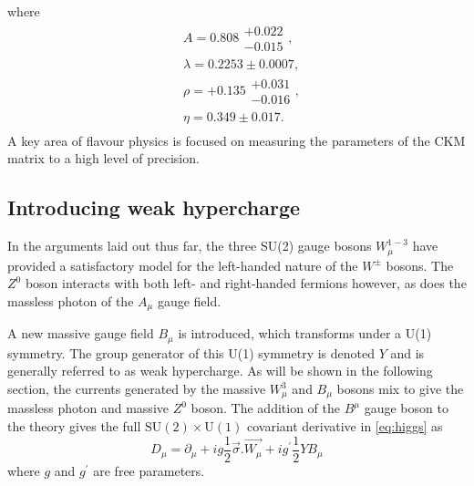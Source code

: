 where 
\begin{equation}
  \begin{split} 
    &A = 0.808\substack{+0.022\\-0.015}, \\
    & \lambda = 0.2253\pm 0.0007,  \\
    & \rho =+ 0.135\substack{+0.031\\-0.016}, \\
    &\eta = 0.349\pm0.017 .\\
    \end{split}
\end{equation}
A key area of flavour physics is focused on measuring the parameters of the CKM matrix to a high level of precision.

\subsection{Introducing weak hypercharge}
In the arguments laid out thus far, the three SU(2) gauge bosons $W^{1-3}_{\mu}$ have provided a satisfactory model for the left-handed nature of the $W^{\pm}$ bosons. The $Z^{0}$ boson interacts with both left- and right-handed fermions however, as does the massless photon of the $A_{\mu}$ gauge field.

A new massive gauge field $B_{\mu}$ is introduced, which transforms under a U(1) symmetry. The group generator of this U(1) symmetry is denoted $Y$ and is generally referred to as weak hypercharge. As will be shown in the following section, the currents generated by the massive $W^{3}_{\mu}$ and $B_{\mu}$ bosons mix to give the massless photon and massive $Z^{0}$ boson. %
The addition of the $B^{\mu}$ gauge boson to the theory gives the full $\mathrm{SU(2)\times U(1)}$ covariant derivative in \autoref{eq:higgs} as 
\begin{equation}
  D_{\mu} = \partial_{\mu}+ig\frac{1}{2}\vec{\sigma}.\vec{W_{\mu}} + ig^{'}\frac{1}{2}YB_{\mu}
  \label{eq:higgscodev}
\end{equation}
where $g$ and $g^{\prime}$ are free parameters.
